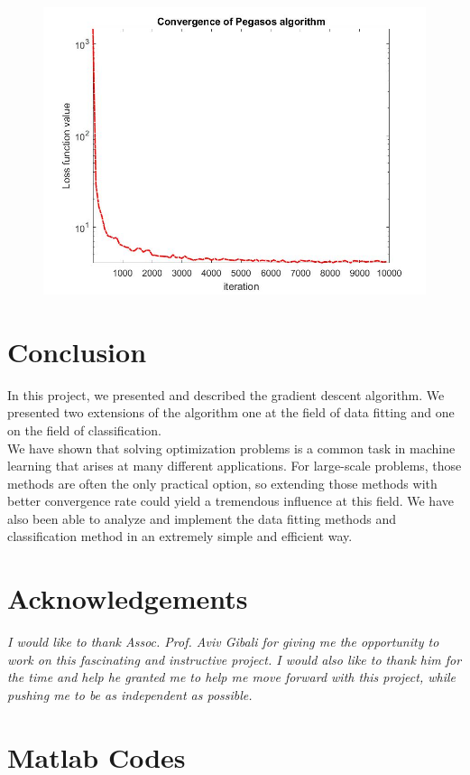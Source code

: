 \documentclass[12pt]{article}
\begin{document}
 \begin{figure}[H]
  \centering
    \includegraphics[scale=0.25]{ConvergeOfPegasos.jpg}
 \end{figure}
 
\newpage
\section{Conclusion}
In this project, we presented and described the gradient descent algorithm. We presented two extensions of the algorithm one at the field of data fitting and one on the field of classification. \\
We have shown that solving optimization problems is a common task in machine learning that arises at many different applications. For large-scale  problems, those methods are often the only practical option, so extending those methods with better convergence rate could yield a tremendous influence at this field.  
We have also been able to analyze and implement the data fitting methods and classification method in an extremely simple and efficient way.


\section{Acknowledgements} 
\textit{I would like to thank Assoc. Prof. Aviv Gibali for giving me the opportunity to work on this fascinating and instructive project. I would also like to thank him for the time and help he granted me to help me move forward with this project, while pushing me to be as independent as possible.}
\newpage
\section{Matlab Codes}
\end{document}
